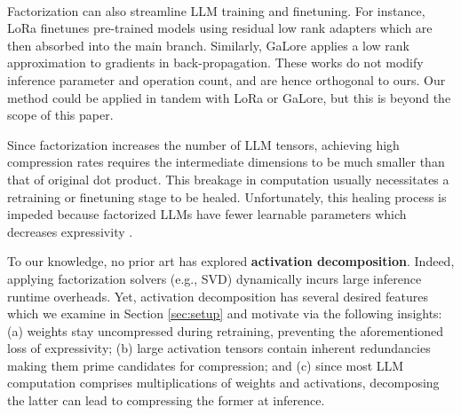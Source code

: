 \documentclass{article}
\theoremstyle{plain}
\begin{document}
~\\
Factorization can also streamline LLM training and finetuning. For instance, LoRa \cite{hu2021LoRa} finetunes pre-trained models using residual low rank adapters which are then absorbed into the main branch. Similarly, GaLore \cite{zhao2024galore} applies a low rank approximation to gradients in back-propagation. These works do not modify inference parameter and operation count, and are hence orthogonal to ours. Our method could be applied in tandem with LoRa or GaLore, but this is beyond the scope of this paper.

Since factorization increases the number of LLM tensors, achieving high compression rates requires the intermediate dimensions to be much smaller than that of original dot product. This breakage in computation usually necessitates a retraining or finetuning stage to be healed. Unfortunately, this healing process is impeded because factorized LLMs have fewer learnable parameters which decreases expressivity \cite{gu2022heat,zhao2024galore}.

To our knowledge, no prior art has explored \textbf{activation decomposition}. Indeed, applying factorization solvers (e.g., SVD) dynamically incurs large inference runtime overheads. Yet, activation decomposition has several desired features which we examine in Section \ref{sec:setup} and motivate via the following insights: (a) weights stay uncompressed during retraining, preventing the aforementioned loss of expressivity; (b) large activation tensors contain inherent redundancies making them prime candidates for compression; and (c) since most LLM computation comprises multiplications of weights and activations, decomposing the latter can lead to compressing the former at inference.

\end{document}
